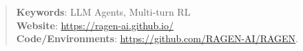 \begin{abstract}

\vspace{3pt}
\textbf{Keywords}: LLM Agents, Multi-turn RL \\
\textbf{Website}: \url{https://ragen-ai.github.io/} \\
\textbf{Code/Environments}:  \url{https://github.com/RAGEN-AI/RAGEN}. 




\end{abstract}
